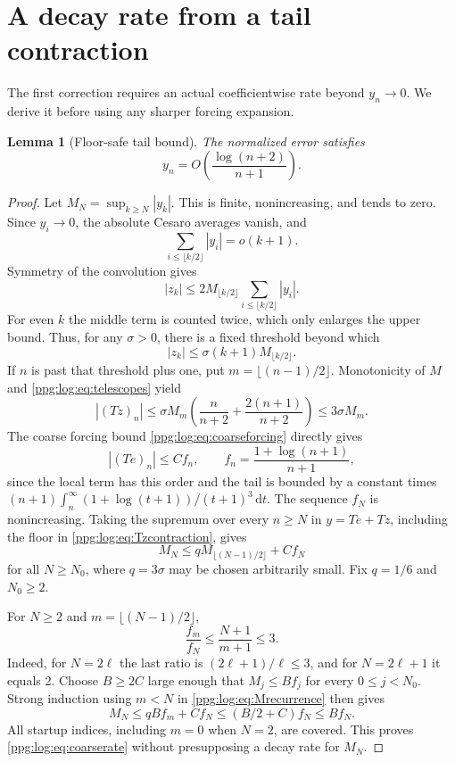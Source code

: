\documentclass[11pt,letterpaper]{article}
\newtheorem{lemma}[theorem]{Lemma}
\theoremstyle{remark}\newtheorem{remark}[theorem]{Remark}
\numberwithin{equation}{section}
\newcommand{\dd}{\mathrm d}
\begin{document}
\section{A decay rate from a tail contraction}\label{ppg:log:sec:contraction}
The first correction requires an actual coefficientwise rate beyond $y_n\to0$. We derive it before using any sharper forcing expansion.

\begin{lemma}[Floor-safe tail bound]\label{ppg:log:lem:tail}
The normalized error satisfies
\begin{equation}\label{ppg:log:eq:coarserate}
 y_n=O\!\left(\frac{\log(n+2)}{n+1}\right).
\end{equation}
\end{lemma}
\begin{proof}
Let $M_N=\sup_{k\ge N}|y_k|$. This is finite, nonincreasing, and tends to zero. Since $y_i\to0$, the absolute Cesaro averages vanish, and
\[
 \sum_{i\le\lfloor k/2\rfloor}|y_i|=o(k+1).
\]
Symmetry of the convolution gives
\[
 |z_k|\le2M_{\lfloor k/2\rfloor}
                 \sum_{i\le\lfloor k/2\rfloor}|y_i|.
\]
For even $k$ the middle term is counted twice, which only enlarges the upper bound. Thus, for any $\sigma>0$, there is a fixed threshold beyond which
\begin{equation}\label{ppg:log:eq:zcontraction}
 |z_k|\le\sigma(k+1)M_{\lfloor k/2\rfloor}.
\end{equation}
If $n$ is past that threshold plus one, put $m=\lfloor(n-1)/2\rfloor$. Monotonicity of $M$ and \eqref{ppg:log:eq:telescopes} yield
\begin{equation}\label{ppg:log:eq:Tzcontraction}
 |(Tz)_n|\le\sigma M_m\left(\frac n{n+2}+\frac{2(n+1)}{n+2}\right)
 \le3\sigma M_m.
\end{equation}
The coarse forcing bound \eqref{ppg:log:eq:coarseforcing} directly gives
\[
 |(Te)_n|\le C f_n,\qquad f_n=\frac{1+\log(n+1)}{n+1},
\]
since the local term has this order and the tail is bounded by a constant times $(n+1)\int_n^\infty(1+\log(t+1))/(t+1)^3\,\dd t$.
The sequence $f_N$ is nonincreasing. Taking the supremum over every $n\ge N$ in $y=Te+Tz$, including the floor in \eqref{ppg:log:eq:Tzcontraction}, gives
\begin{equation}\label{ppg:log:eq:Mrecurrence}
 M_N\le qM_{\lfloor(N-1)/2\rfloor}+Cf_N
\end{equation}
for all $N\ge N_0$, where $q=3\sigma$ may be chosen arbitrarily small. Fix $q=1/6$ and $N_0\ge2$.

For $N\ge2$ and $m=\lfloor(N-1)/2\rfloor$,
\[
 \frac{f_m}{f_N}\le\frac{N+1}{m+1}\le3.
\]
Indeed, for $N=2\ell$ the last ratio is $(2\ell+1)/\ell\le3$, and for $N=2\ell+1$ it equals 2. Choose $B\ge2C$ large enough that $M_j\le Bf_j$ for every $0\le j<N_0$. Strong induction using $m<N$ in \eqref{ppg:log:eq:Mrecurrence} then gives
\[
 M_N\le qBf_m+Cf_N\le(B/2+C)f_N\le Bf_N.
\]
All startup indices, including $m=0$ when $N=2$, are covered. This proves \eqref{ppg:log:eq:coarserate} without presupposing a decay rate for $M_N$.
\end{proof}
\end{document}
